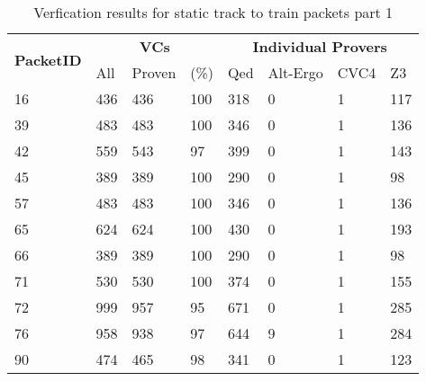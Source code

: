 \begin{table}[hbt]
\begin{center}
    \begin{tabular}{|m{10ex}|m{5ex}m{5ex}m{5ex}|m{5ex}m{5ex}m{5ex}m{5ex}|}
\hline
\multirow{2}{*}{\textbf{PacketID}} &
\multicolumn{3}{c|}{ \textbf{VCs}} &
\multicolumn{4}{c|}{\textbf{Individual Provers}}\\
\cline{2-8}
               &  All & Proven & (\%) & Qed & Alt-Ergo & CVC4 & Z3  \\
\hline
\hline
16 & 436 & 436 & 100 & 318 & 0 & 1 & 117\\
\hline
39 & 483 & 483 & 100 & 346 & 0 & 1 & 136\\
\hline
42 & 559 & 543 & 97 & 399 & 0 & 1 & 143\\
\hline
45 & 389 & 389 & 100 & 290 & 0 & 1 & 98\\
\hline
57 & 483 & 483 & 100 & 346 & 0 & 1 & 136\\
\hline
65 & 624 & 624 & 100 & 430 & 0 & 1 & 193\\
\hline
66 & 389 & 389 & 100 & 290 & 0 & 1 & 98\\
\hline
71 & 530 & 530 & 100 & 374 & 0 & 1 & 155\\
\hline
72 & 999 & 957 & 95 & 671 & 0 & 1 & 285\\
\hline
76 & 958 & 938 & 97 & 644 & 9 & 1 & 284\\
\hline
90 & 474 & 465 & 98 & 341 & 0 & 1 & 123\\
\hline
\end{tabular}
\end{center}
\caption{\label{tbl:packets-without-niter-tracktotrain-part1} Verfication results for static track to train packets part 1}
\end{table}

\FloatBarrier  %

